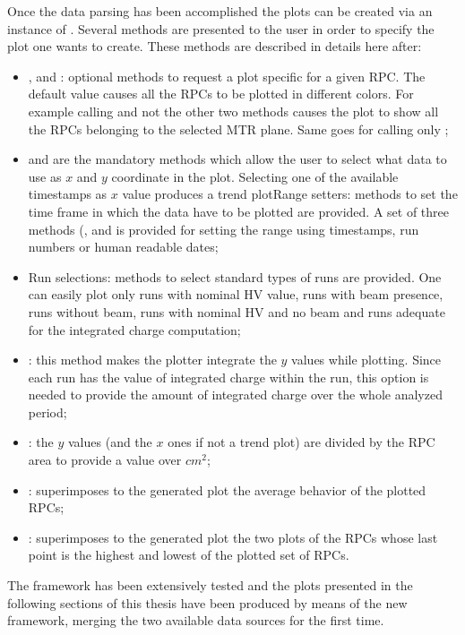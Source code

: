 Once the data parsing has been accomplished the plots can be created via an instance of .
Several methods are presented to the user in order to specify the plot one wants to create.
These methods are described in details here after:
\begin{itemize}
\item {}, and : optional methods to request a plot specific for a given RPC. The default value causes all the RPCs to be plotted in different colors. For example calling  and not the other two methods causes the plot to show all the RPCs belonging to the selected MTR plane. Same goes for calling only ;
\item {} and  are the mandatory methods which allow the user to select what  data to use as $x$ and $y$ coordinate in the plot. Selecting one of the available timestamps as $x$ value produces a trend plotRange setters: methods to set the time frame in which the data have to be plotted are provided. A set of three methods (, and  is provided for setting the range using timestamps, run numbers or human readable dates;
\item Run selections: methods to select standard types of runs are provided. One can easily plot only runs with nominal HV value, runs with beam presence, runs without beam, runs with nominal HV and no beam and runs adequate for the integrated charge computation;
\item {}: this method makes the plotter integrate the $y$ values while plotting. Since each run has the value of integrated charge within the run, this option is needed to provide the amount of integrated charge over the whole analyzed period;
\item {}: the $y$ values (and the $x$ ones if not a trend plot) are divided by the RPC area to provide a value over $cm^2$;
\item {}: superimposes to the generated plot the average behavior of the plotted RPCs;
\item {}: superimposes to the generated plot the two plots of the RPCs whose last point is the highest and lowest of the plotted set of RPCs.
\end{itemize}

The framework has been extensively tested and the plots presented in the following sections of this thesis have been produced by means of the new framework, merging the two available data sources for the first time.

